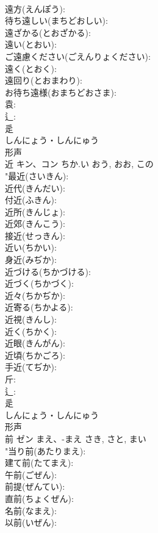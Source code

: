 \documentclass[8pt]{extreport}
\begin{document}
\begin{CJK}{UTF8}{min}
\\	遠方(えんぽう): 
\\	待ち遠しい(まちどおしい): 
\\	遠ざかる(とおざかる): 
\\	遠い(とおい): 
\\	ご遠慮ください(ごえんりょください): 
\\	遠く(とおく): 
\\	遠回り(とおまわり): 
\\	お待ち遠様(おまちどおさま): 
\\	袁: 
\\	辶: 
\\	辵	
\\	しんにょう・しんにゅう	
\\	形声 
\\	近	キン、コン	ちか.い	おう, おお, この	
\\	"最近(さいきん): 
\\	近代(きんだい): 
\\	付近(ふきん): 
\\	近所(きんじょ): 
\\	近郊(きんこう): 
\\	接近(せっきん): 
\\	近い(ちかい): 
\\	身近(みぢか): 
\\	近づける(ちかづける): 
\\	近づく(ちかづく): 
\\	近々(ちかぢか): 
\\	近寄る(ちかよる): 
\\	近視(きんし): 
\\	近く(ちかく): 
\\	近眼(きんがん): 
\\	近頃(ちかごろ): 
\\	手近(てぢか): 
\\	斤: 
\\	辶: 
\\	辵	
\\	しんにょう・しんにゅう	
\\	形声 
\\	前	ゼン	まえ、-まえ	さき, さと, まい	
\\	"当り前(あたりまえ): 
\\	建て前(たてまえ): 
\\	午前(ごぜん): 
\\	前提(ぜんてい): 
\\	直前(ちょくぜん): 
\\	名前(なまえ): 
\\	以前(いぜん): 

\end{CJK}
\end{document}
